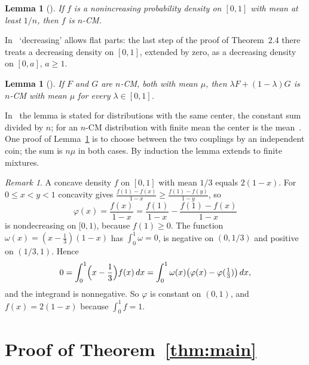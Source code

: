\documentclass[11pt]{amsart}
\newtheorem{lemma}[theorem]{Lemma}
\theoremstyle{remark}
\newtheorem{remark}[theorem]{Remark}
\numberwithin{equation}{section}
\begin{document}
\begin{lemma}[{\cite[Theorem~2.4]{WW11}}]\label{lem:monotone}
If $f$ is a nonincreasing probability density on $[0,1]$ with mean at least
$1/n$, then $f$ is $n$-CM.
\end{lemma}

In~\cite{WW11} `decreasing' allows flat parts: the last step of the proof
of Theorem~2.4 there treats a decreasing density on $[0,1]$, extended by
zero, as a decreasing density on $[0,a]$, $a\ge1$.

\begin{lemma}[{\cite[Proposition~2.1(3)]{WW11}}]\label{lem:convex}
If $F$ and $G$ are $n$-CM, both with mean $\mu$, then $\lambda
F+(1-\lambda)G$ is $n$-CM with mean $\mu$ for every $\lambda\in[0,1]$.
\end{lemma}

In~\cite{WW11} the lemma is stated for distributions with the same center,
the constant sum divided by $n$; for an $n$-CM distribution with finite mean
the center is the mean~\cite[Proposition~2.1(2)]{WW11}. One proof of
Lemma~\ref{lem:convex} is to choose between the two couplings by an
independent coin; the sum is $n\mu$ in both cases. By induction the lemma
extends to finite mixtures.

\begin{remark}\label{rem:concave}
A concave density $f$ on $[0,1]$ with mean $1/3$ equals $2(1-x)$. For
$0\le x<y<1$ concavity gives
$\frac{f(1)-f(x)}{1-x}\ge\frac{f(1)-f(y)}{1-y}$, so
\[
\varphi(x)=\frac{f(x)}{1-x}=\frac{f(1)}{1-x}-\frac{f(1)-f(x)}{1-x}
\]
is nondecreasing on $[0,1)$, because $f(1)\ge0$. The function
$\omega(x)=(x-\frac13)(1-x)$ has $\int_0^1\omega=0$, is negative on
$(0,1/3)$ and positive on $(1/3,1)$. Hence
\[
0=\int_0^1\Bigl(x-\frac13\Bigr)f(x)\,dx
=\int_0^1\omega(x)\bigl(\varphi(x)-\varphi(\tfrac13)\bigr)\,dx,
\]
and the integrand is nonnegative. So $\varphi$ is constant on $(0,1)$, and
$f(x)=2(1-x)$ because $\int_0^1f=1$.
\end{remark}

\section{Proof of Theorem~\ref{thm:main}}\label{sec:proof}
\end{document}
